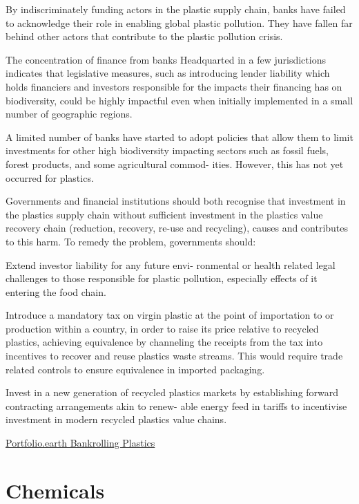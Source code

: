\documentclass[
]{book}
\begin{document}
By indiscriminately funding actors in the plastic
supply chain, banks have failed to acknowledge
their role in enabling global plastic pollution.
They have fallen far behind other actors that
contribute to the plastic pollution crisis.

The concentration of finance
from banks Headquarted in
a few jurisdictions indicates
that legislative measures, such
as introducing lender liability
which holds financiers and
investors responsible for the
impacts their financing has on
biodiversity, could be highly
impactful even when initially
implemented in a small number
of geographic regions.

A limited number of banks have started to adopt
policies that allow them to limit investments for other
high biodiversity impacting sectors such as fossil
fuels, forest products, and some agricultural commod-
ities. However, this has not yet occurred for plastics.

Governments and financial institutions
should both recognise that investment in the plastics
supply chain without sufficient investment in the
plastics value recovery chain (reduction, recovery,
re-use and recycling), causes and contributes to this
harm. To remedy the problem, governments should:

Extend investor liability for any future envi-
ronmental or health related legal challenges
to those responsible for plastic pollution,
especially effects of it entering the food
chain.

Introduce a mandatory tax on virgin plastic
at the point of importation to or production
within a country, in order to raise its price
relative to recycled plastics, achieving
equivalence by channeling the receipts from
the tax into incentives to recover and reuse
plastics waste streams. This would require
trade related controls to ensure equivalence
in imported packaging.

Invest in a new generation of recycled
plastics markets by establishing forward
contracting arrangements akin to renew-
able energy feed in tariffs to incentivise
investment in modern recycled plastics
value chains.

\href{https://portfolio.earth/campaigns/bankrolling-plastics/}{Portfolio.earth Bankrolling Plastics}

\hypertarget{chemicals}{%
\section{Chemicals}\label{chemicals}}
\end{document}
